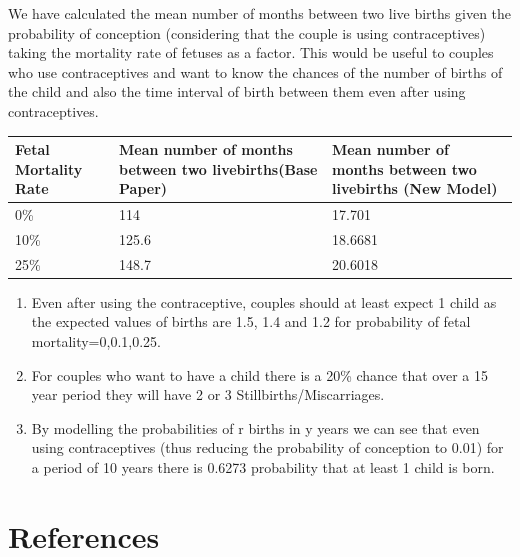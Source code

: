 \documentclass{article}
\begin{document}
We have calculated the mean number of months between two live births given the probability of conception (considering that the couple is using contraceptives) taking the mortality rate of fetuses as a factor. This would be useful to couples who use contraceptives and want to know the chances of the number of births of the child and also the time interval of birth between them even after using contraceptives.\\
	\begin{table}[H]
		\begin{center}
			\begin{tabular}{|m{2.4154cm}|m{6.4154cm}|m{6.4154cm}|}
				\hline
				Fetal Mortality Rate  & Mean number of months between two livebirths(Base Paper) & Mean number of months between two livebirths (New Model)\\ \hline
				0\% & 114    &17.701 \\ \hline
				10\% & 125.6 &18.6681 \\ \hline
				25\% & 148.7 &20.6018 \\ \hline
			\end{tabular}
		\end{center}
	\end{table}


\begin{enumerate}
\item Even after using the contraceptive, couples should at least expect 1 child as the expected values of births are 1.5, 1.4 and 1.2 for probability of fetal mortality=0,0.1,0.25.
\item For couples who want to have a child there is a 20\% chance that over a 15 year period they will have 2 or 3 Stillbirths/Miscarriages.
\item By modelling the probabilities of r births in y years we can see that even using contraceptives (thus reducing the probability of conception to 0.01) for a period of 10 years there is 0.6273 probability that at least 1 child is born.
\end{enumerate} 

\section{References}




\end{document}

